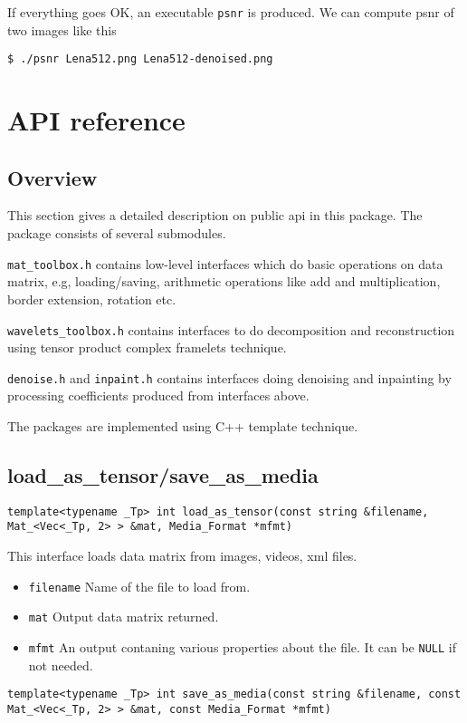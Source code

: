 \documentclass[a4paper,5pt]{article}
\begin{document}
If everything goes OK, an executable \lstinline{psnr} is produced. We can compute psnr of two images like this

\lstinline{$ ./psnr Lena512.png Lena512-denoised.png}

\section{API reference}

\subsection{Overview}
This section gives a detailed description on public api in this package. The package consists of several submodules.

\lstinline{mat_toolbox.h} contains low-level interfaces which do basic operations on data matrix, e.g, loading/saving, arithmetic operations like add and multiplication, border extension, rotation etc.

\lstinline{wavelets_toolbox.h} contains interfaces to do decomposition and reconstruction using tensor product complex framelets technique.

\lstinline{denoise.h} and \lstinline{inpaint.h} contains interfaces doing denoising and inpainting by processing coefficients produced from interfaces above.

The packages are implemented using C++ template technique.

\subsection{load\_as\_tensor/save\_as\_media}
\lstinline{template<typename _Tp> int load_as_tensor(const string &filename, Mat_<Vec<_Tp, 2> > &mat, Media_Format *mfmt)}


This interface loads data matrix from images, videos, xml files.

\begin{itemize}
\item \lstinline{filename} Name of the file to load from.
\item \lstinline{mat} Output data matrix returned.
\item \lstinline{mfmt} An output contaning various properties about the file. It can be \lstinline{NULL} if not needed.
\end{itemize}

\noindent
\lstinline{template<typename _Tp> int save_as_media(const string &filename, const Mat_<Vec<_Tp, 2> > &mat, const Media_Format *mfmt) }
\end{document}
